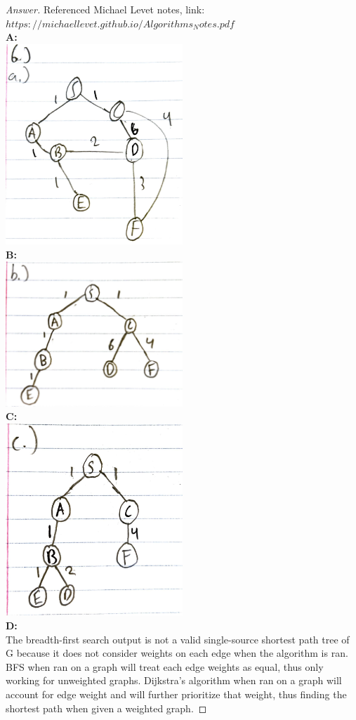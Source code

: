 \documentclass[11pt]{article}
\theoremstyle{definition}
\theoremstyle{definition}
\theoremstyle{definition}
\begin{document}
\begin{proof}[Answer] Referenced Michael Levet notes, link: $https://michaellevet.github.io/Algorithms_Notes.pdf$ \\
\textbf{A:}\\
\includegraphics[width=0.5\textwidth,angle=360]{CSCI3104_HE1__Q6A.pdf} \\
\textbf{B:}\\
\includegraphics[width=0.5\textwidth,angle=360]{CSCI3104_HW1_Q6B.pdf} \\
\textbf{C:}\\
\includegraphics[width=0.5\textwidth,angle=360]{CSCI3104_HW1_Q6C.pdf} \\
\textbf {D:}\\
The breadth-first search output is not a valid single-source shortest path tree of G because it does not consider weights on each edge when the algorithm is ran. BFS when ran on a graph will treat each edge weights as equal, thus only working for unweighted graphs. Dijkstra’s algorithm when ran on a graph will account for edge weight and will further prioritize that weight, thus finding the shortest path when given a weighted graph.
\end{proof}
\end{document}
